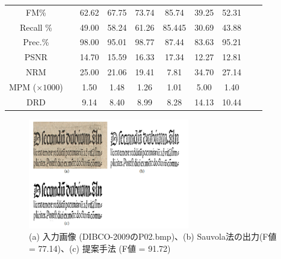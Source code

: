\documentclass[uplatex, twocolumn,10pt]{jsarticle}
\begin{document}
\begin{table}[tp]
\begin{tabular}{cccccccccc}
        \midrule
        FM\%               &  & 62.62                             & 67.75                            & 73.74                            & 85.74    & 39.25   & 52.31    \\
        Recall \%          &  & 49.00                             & 58.24                            & 61.26                            & 85.445   & 30.69   & 43.88    \\
        Prec.\%            &  & 98.00                             & 95.01                            & 98.77                            & 87.44    & 83.63   & 95.21    \\
        PSNR               &  & 14.70                             & 15.59                            & 16.33                            & 17.34    & 12.27   & 12.81    \\
        NRM                &  & 25.00                             & 21.06                            & 19.41                            & 7.81     & 34.70   & 27.14    \\
        MPM ($\times1000$) &  & 1.50                              & 1.48                             & 1.26                             & 1.01     & 5.00    & 1.40     \\
        DRD                &  & 9.14                              & 8.40                             & 8.99                             & 8.28     & 14.13   & 10.44    \\
        \bottomrule
    \end{tabular}
\end{table}

\begin{figure}[tp]
    \begin{center}
        \includegraphics*[width=7cm]{image/master/Fig3.png}
        \caption{(a) 入力画像 (DIBCO-2009のP02.bmp)、(b) Sauvola法の出力(F値 = 77.14)、(c) 提案手法 (F値 = 91.72)}
        \label{fig3}
    \end{center}
\end{figure}
\end{document}
